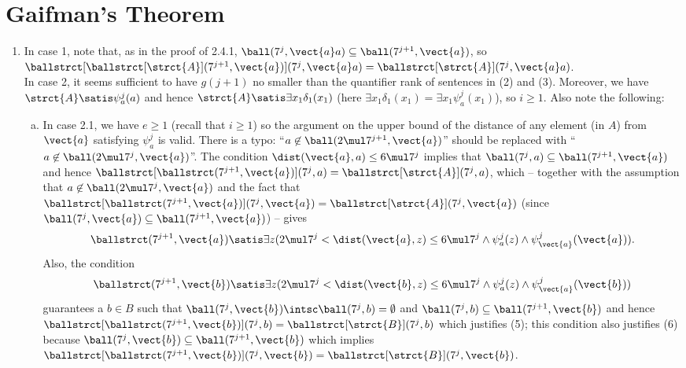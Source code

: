 \section{Gaifman's Theorem}
\begin{enumerate}[1.]
%
\item {} In case 1, note that, as in the proof of 2.4.1, $\ball(7^j, \vect{a}a) \subseteq \ball(7^{j + 1}, \vect{a})$, so $\ballstrct[{\ballstrct[\strct{A}](7^{j + 1}, \vect{a})}](7^j, \vect{a}a) = \ballstrct[\strct{A}](7^j, \vect{a}a)$.
\medskip\\
In case 2, it seems sufficient to have $g(j + 1)$ no smaller than the quantifier rank of sentences in (2) and (3). Moreover, we have $\strct{A} \satis \psi^j_a(a)$ and hence $\strct{A} \satis \exists x_1 \delta_1(x_1)$ (here $\exists x_1 \delta_1(x_1) = \exists x_1 \psi^j_a(x_1)$), so $i \geq 1$. Also note the following:
\begin{enumerate}[(a)]
\item In case 2.1, we have $e \geq 1$ (recall that $i \geq 1$) so the argument on the upper bound of the distance of any element (in $A$) from $\vect{a}$ satisfying $\psi^j_a$ is valid. There is a typo: ``$a \not\in \ball(2 \mul 7^{j + 1}, \vect{a})$'' should be replaced with ``$a \not\in \ball(2 \mul 7^j, \vect{a})$''. The condition $\dist(\vect{a}, a) \leq 6 \mul 7^j$ implies that $\ball(7^j, a) \subseteq \ball(7^{j + 1}, \vect{a})$ and hence $\ballstrct[\ballstrct(7^{j + 1}, \vect{a})](7^j, a) = \ballstrct[\strct{A}](7^j, a)$, which -- together with the assumption that $a \not\in \ball(2 \mul 7^j, \vect{a})$ and the fact that $\ballstrct[\ballstrct(7^{j + 1}, \vect{a})](7^j, \vect{a}) = \ballstrct[\strct{A}](7^j, \vect{a})$ (since $\ball(7^j, \vect{a}) \subseteq \ball(7^{j + 1}, \vect{a})$) -- gives
\[
\ballstrct(7^{j + 1}, \vect{a}) \satis \exists z (2 \mul 7^j < \dist(\vect{a}, z) \leq 6 \mul 7^j \land \psi^j_a(z) \land \psi^j_{\vect{a}}(\vect{a})).
\]
Also, the condition
\[
\ballstrct(7^{j + 1}, \vect{b}) \satis \exists z (2 \mul 7^j < \dist(\vect{b}, z) \leq 6 \mul 7^j \land \psi^j_a(z) \land \psi^j_{\vect{a}}(\vect{b}))
\]
guarantees a $b \in B$ such that $\ball(7^j, \vect{b}) \intsc \ball(7^j, b) = \emptyset$ and $\ball(7^j, b) \subseteq \ball(7^{j + 1}, \vect{b})$ and hence $\ballstrct[\ballstrct(7^{j + 1}, \vect{b})](7^j, b) = \ballstrct[\strct{B}](7^j, b)$ which justifies (5); this condition also justifies (6) because $\ball(7^j, \vect{b}) \subseteq \ball(7^{j + 1}, \vect{b})$ which implies $\ballstrct[\ballstrct(7^{j + 1}, \vect{b})](7^j, \vect{b}) = \ballstrct[\strct{B}](7^j, \vect{b})$.

\end{enumerate}
\end{enumerate}
